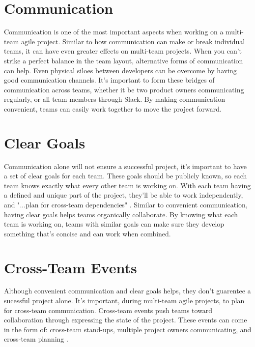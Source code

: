 \documentclass[sigplan,screen]{acmart}
\begin{document}
\section{Communication}
Communication is one of the most important aspects when working on a multi-team agile project.
Similar to how communication can make or break individual teams, it can have even greater effects on multi-team projects.
When you can't strike a perfect balance in the team layout, alternative forms of communication can help.
Even physical siloes between developers can be overcome by having good communication channels.
It's important to form these bridges of communication across teams, whether it be two product owners communicating regularly, or all team members through Slack.
By making communication convenient, teams can easily work together to move the project forward.

\section{Clear Goals}
Communication alone will not ensure a successful project, it's important to have a set of clear goals for each team.
These goals should be publicly known, so each team knows exactly what every other team is working on.
With each team having a defined and unique part of the project, they'll be able to work independently, and "...plan for cross-team dependencies" \cite{b2}. 
Similar to convenient communication, having clear goals helps teams organically collaborate.
By knowing what each team is working on, teams with similar goals can make sure they develop something that's concise and can work when combined.

\section{Cross-Team Events}
Although convenient communication and clear goals helps, they don't guarentee a sucessful project alone.
It's important, during multi-team agile projects, to plan for cross-team communication.
Cross-team events push teams toward collaboration through expressing the state of the project.
These events can come in the form of: cross-team stand-ups, multiple project owners communicating, and cross-team planning \cite{b2}.
\end{document}
